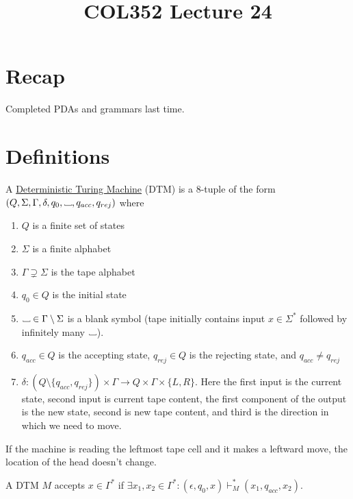 \documentclass[a4paper]{article}
\title{\textbf{COL352 Lecture 24}}
\date{}
\newcommand{\changesto}{\vdash}
\newcommand\Vtextvisiblespace[1][.3em]{%
    \mbox{\kern.06em\vrule height.3ex}%
    \vbox{\hrule width#1}%
    \hbox{\vrule height.3ex}
}
\newcommand{\blank}{{\Vtextvisiblespace[0.7em]}}
\begin{document}
\maketitle
\tableofcontents

\section{Recap}

Completed PDAs and grammars last time.

\section{Definitions}

\begin{defn}
    A \underline{Deterministic Turing Machine} (DTM) is a 8-tuple of the form $(Q, \Sigma, \Gamma, \delta, q_0, \blank, q_{acc}, q_{rej})$ where
    \begin{enumerate}
        \item $Q$ is a finite set of states
        \item $\Sigma$ is a finite alphabet
        \item $\Gamma \supsetneq \Sigma$ is the tape alphabet
        \item $q_0 \in Q$ is the initial state
        \item $\blank \in \Gamma \setminus \Sigma$ is a blank symbol (tape initially contains input $x \in \Sigma^*$ followed by infinitely many $\blank$).
        \item $q_{acc} \in Q$ is the accepting state, $q_{rej} \in Q$ is the rejecting state, and $q_{acc} \ne q_{rej}$
        \item $\delta : (Q \setminus \{q_{acc}, q_{rej}\}) \times \Gamma \to Q \times \Gamma \times \{L, R\}$.
            Here the first input is the current state, second input is current tape content, the first component of the output is the new state, second is new tape content, and third is the
            direction in which we need to move.
    \end{enumerate}
    If the machine is reading the leftmost tape cell and it makes a leftward move, the location of the head doesn't change.
\end{defn}

\begin{defn}
    A DTM $M$ accepts $x \in \Gamma^*$ if $\exists x_1, x_2 \in \Gamma^* : (\epsilon, q_0, x) \changesto^*_M (x_1, q_{acc}, x_2)$.
\end{defn}
\end{document}
